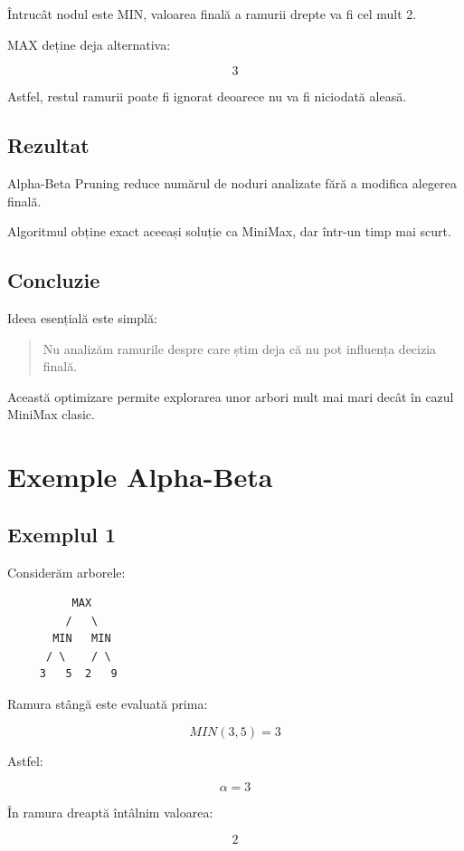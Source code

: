 \documentclass[12pt,a4paper]{article}
\begin{document}
Întrucât nodul este MIN, valoarea finală a ramurii drepte va fi cel mult 2.

MAX deține deja alternativa:

\[
3
\]

Astfel, restul ramurii poate fi ignorat deoarece nu va fi niciodată aleasă.

\subsection{Rezultat}

Alpha-Beta Pruning reduce numărul de noduri analizate fără a modifica alegerea finală.

Algoritmul obține exact aceeași soluție ca MiniMax, dar într-un timp mai scurt.

\subsection{Concluzie}

Ideea esențială este simplă:

\begin{quote}
Nu analizăm ramurile despre care știm deja că nu pot influența decizia finală.
\end{quote}

Această optimizare permite explorarea unor arbori mult mai mari decât în cazul MiniMax clasic.




\section{Exemple Alpha-Beta}

\subsection{Exemplul 1}

Considerăm arborele:

\begin{verbatim}
          MAX
         /   \
       MIN   MIN
      / \    / \
     3   5  2   9
\end{verbatim}

Ramura stângă este evaluată prima:

\[
MIN(3,5)=3
\]

Astfel:

\[
\alpha = 3
\]

În ramura dreaptă întâlnim valoarea:

\[
2
\]
\end{document}

